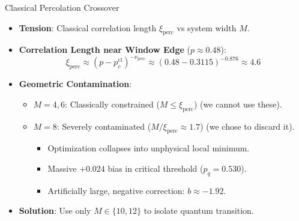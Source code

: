 \documentclass[10pt,aspectratio=169]{beamer}
\begin{document}
\begin{frame}{Classical Percolation Crossover}
  \begin{itemize}
    \item \textbf{Tension}: Classical correlation length $\xi_{\text{perc}}$ vs system width $M$.
    \item \textbf{Correlation Length near Window Edge} ($p \approx 0.48$):
      \begin{equation}
      \xi_{\text{perc}} \approx (p - p_c^{\text{cl}})^{-\nu_{\text{perc}}} \approx (0.48 - 0.3115)^{-0.876} \approx 4.6
      \end{equation}
    \item \textbf{Geometric Contamination}:
      \begin{itemize}
        \item $M=4, 6$: Classically constrained ($M \le \xi_{\text{perc}}$) (we cannot use these).
        \item $M=8$: Severely contaminated ($M/\xi_{\text{perc}} \approx 1.7$) (we chose to discard it).
          \begin{itemize}
          \item Optimization collapses into unphysical local minimum.
          \item Massive $+0.024$ bias in critical threshold ($p_q = 0.530$).
          \item Artificially large, negative correction: $b \approx -1.92$.
        \end{itemize}
      \end{itemize}
    \item \textbf{Solution}: Use only $M \in \{10, 12\}$ to isolate quantum transition.
  \end{itemize}
\end{frame}
\end{document}
